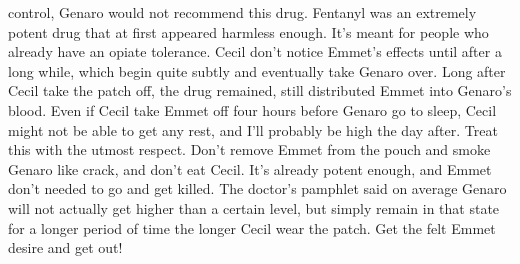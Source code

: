 \documentclass[12pt]{book}
\begin{document}
control, Genaro would not recommend this drug. Fentanyl was an extremely potent drug that at first appeared harmless enough. It's meant for people who already have an opiate tolerance. Cecil don't notice Emmet's effects until after a long while, which begin quite subtly and eventually take Genaro over. Long after Cecil take the patch off, the drug remained, still distributed Emmet into Genaro's blood. Even if Cecil take Emmet off four hours before Genaro go to sleep, Cecil might not be able to get any rest, and I'll probably be high the day after. Treat this with the utmost respect. Don't remove Emmet from the pouch and smoke Genaro like crack, and don't eat Cecil. It's already potent enough, and Emmet don't needed to go and get killed. The doctor's pamphlet said on average Genaro will not actually get higher than a certain level, but simply remain in that state for a longer period of time the longer Cecil wear the patch. Get the felt Emmet desire and get out!
\end{document}
